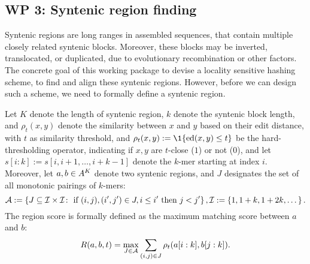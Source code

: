 \subsection{WP 3: Syntenic region finding}
Syntenic regions are long ranges in assembled sequences, that contain multiple closely related syntenic blocks. Moreover, these blocks may be inverted, translocated, or duplicated, due to evolutionary recombination or other factors. The concrete goal of this working package to devise a locality sensitive hashing scheme, to find and align these syntenic regions. However, before we can design such a scheme, we need to formally define a syntenic region. 

Let $K$ denote the length of syntenic region, $k$ denote the syntenic block length, and $\rho_t(x,y)$ denote the similarity between $x$ and $y$ based on their edit distance, with $t$ as similarity threshold, and $\rho_t(x,y):=\1\{\ED(x,y)\le t\}$ be the hard-thresholding operator, indicating if $x,y$ are $t$-close ($1$) or not ($0$), and let $s[i:k]:=s[i,i+1,\dots,i+k-1]$ denote the $k$-mer starting at index $i$. Moreover, let $a, b\in A^K$ denote two syntenic regions, and $J$ designates the set of all monotonic pairings of $k$-mers:
\begin{equation}
\label{eq:def_monton_pairs}
\mathcal{A}:= \left\{J\subseteq {\mathcal{I}\times \mathcal{I}}\colon \text{ if }  (i,j), (i',j')\in J,i\le i'\text{ then } j<j' \right\}, \mathcal{I}:=\left\{1,1+k,1+2k,\dots\right\}.
\end{equation}
The region score is formally defined as the maximum matching score between $a$ and $b$:
\begin{equation}
\label{eq:syntenic_region_score_sorted}
R(a, b,t) =  \max_{J\in \mathcal{A}}
\sum_{(i,j)\in J}\rho_t(a[i:k], b[j:k]).
\end{equation}

